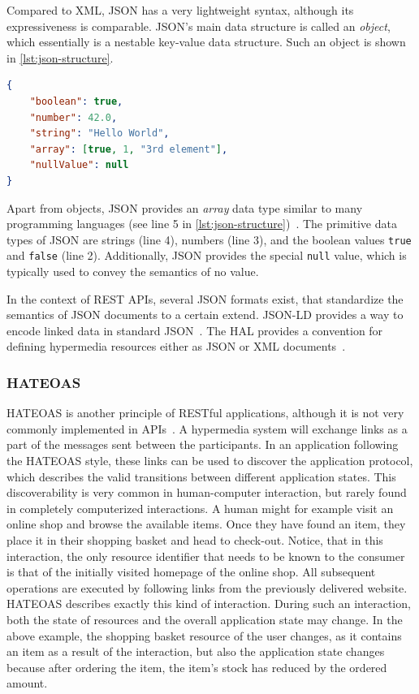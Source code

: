 Compared to \ac{XML}, \ac{JSON} has a very lightweight syntax, although its expressiveness is comparable.
\ac{JSON}'s main data structure is called an \textit{object}, which essentially is a nestable key-value data structure.
Such an object is shown in \autoref{lst:json-structure}.

\begin{lstlisting}[caption={\acs{JSON} Data Types and Structures}, label=lst:json-structure, language=json]
{
    "boolean": true,
    "number": 42.0,
    "string": "Hello World",
    "array": [true, 1, "3rd element"],
    "nullValue": null
}
\end{lstlisting}

Apart from objects, \ac{JSON} provides an \textit{array} data type similar to many programming languages (see line 5 in \autoref{lst:json-structure})~\cite{ECMAInternational2017}.
The primitive data types of \ac{JSON} are strings (line 4), numbers (line 3), and the boolean values \texttt{true} and \texttt{false} (line 2).
Additionally, \ac{JSON} provides the special \texttt{null} value, which is typically used to convey the semantics of no value.

In the context of \ac{REST} \acp{API}, several \ac{JSON} formats exist, that standardize the semantics of \ac{JSON} documents to a certain extend.
JSON-LD provides a way to encode linked data in standard \ac{JSON}~\cite{Kellogg2020}.
The \ac{HAL} provides a convention for defining hypermedia resources either as \ac{JSON} or \ac{XML} documents~\cite{HALdraft}.

\subsubsection{\acf{HATEOAS}}

\ac{HATEOAS} is another principle of \ac{REST}ful applications, although it is not very commonly implemented in \acp{API}~\cite{Liskin2011,Webber2010,Adamczyk2011}.
A hypermedia system will exchange links as a part of the messages sent between the participants.
In an application following the \ac{HATEOAS} style, these links can be used to discover the application protocol, which describes the valid transitions between different application states.
This discoverability is very common in human-computer interaction, but rarely found in completely computerized interactions.
A human might for example visit an online shop and browse the available items.
Once they have found an item, they place it in their shopping basket and head to check-out.
Notice, that in this interaction, the only resource identifier that needs to be known to the consumer is that of the initially visited homepage of the online shop.
All subsequent operations are executed by following links from the previously delivered website.
\ac{HATEOAS} describes exactly this kind of interaction.
During such an interaction, both the state of resources and the overall application state may change.
In the above example, the shopping basket resource of the user changes, as it contains an item as a result of the interaction, but also the application state changes because after ordering the item, the item's stock has reduced by the ordered amount.

